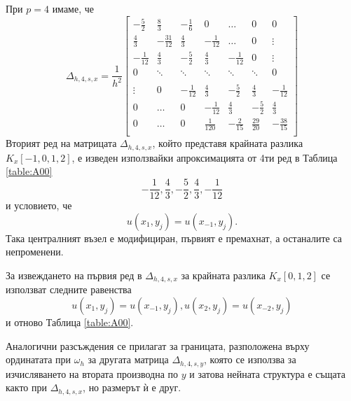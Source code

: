 \documentclass[a4paper]{article}
\theoremstyle{remark}
\begin{document}
\begin{large}
При $p=4$ имаме, че 
\[
\Delta_{h,4,s,x} = \frac{1}{h^2}
\begin{bmatrix}
     -\frac{5}{2}	& \frac{8}{3}       & -\frac{1}{6}	&    0     			&    \dots      	   &   0           & 0    \\
    \frac{4}{3}          &-\frac{31}{12}    	& \frac{4}{3}	&   -\frac{1}{12}	  	&   \dots      	  &   0	           & \vdots  \\
    -\frac{1}{12}	& \frac{4}{3}         	& -\frac{5}{2}	&  \frac{4}{3}    	 &   -\frac{1}{12}	  &      0           &\vdots    \\
        0           		& \ddots        	&    \ddots   		 &   \ddots      	 &     \ddots      	  &  \ddots        &    0 \\	
\\
   \vdots      		 & 0           		 &  -\frac{1}{12}	& \frac{4}{3}    	& -\frac{5}{2}	&  \frac{4}{3}   &   -\frac{1}{12} \\
    0      		 &  \dots           	 &   0     		& -\frac{1}{12} 	 & \frac{4}{3} 	 & -\frac{5}{2}  &  \frac{4}{3}\\
    0              		 & \dots          	&  0              		 &\frac{1}{120} 	 &  -\frac{2}{15} 	& \frac{29}{20} & -\frac{38}{15}\\
\end{bmatrix}
\]
Вторият ред на матрицата $\Delta_{h,4,s,x}$, който представя крайната разлика $K_x[-1,0,1,2]$, е изведен използвайки апроксимацията от 4ти ред в Таблица \ref{table:A00}
$$ -\frac{1}{12}, \frac{4}{3}, -\frac{5}{2},  \frac{4}{3}, -\frac{1}{12} $$ и условието, че
$$u(x_1, y_j) = u(x_{-1}, y_j).$$
Така централният възел е модифициран, първият е премахнат, а останалите са непроменени. 

За извеждането на първия ред в $\Delta_{h,4,s,x}$ за крайната разлика $K_x[0,1,2]$ се използват следните равенства
$$u(x_1, y_j) = u(x_{-1}, y_j), u(x_2, y_j) = u(x_{-2}, y_j)$$
и отново Таблица \ref{table:A00}.

Аналогични разсъждения се прилагат за границата, разположена върху ординатата при $\omega_h$ за другата матрица $\Delta_{h,4,s,y}$, която се използва за изчисляването на втората производна по $y$ и затова нейната структура е същата както при $\Delta_{h,4,s,x}$, но размерът ѝ е друг.


\end{large}
\end{document}
